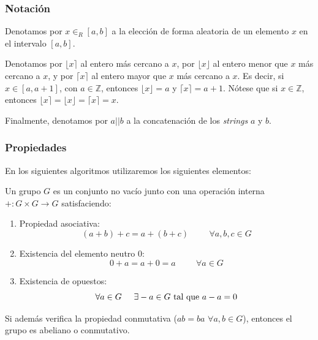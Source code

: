 \subsubsection{Notación}

Denotamos por $x \in_{R} [a, b]$ a la elección de forma aleatoria de un elemento $x$ en el intervalo $[a, b]$.

Denotamos por $\lfloor x \rceil$ al entero más cercano a $x$, por $\lfloor x \rfloor$ al entero menor que $x$ más cercano a $x$, y por $\lceil x \rceil$ al entero mayor que $x$ más cercano a $x$. Es decir, si $x \in [a, a+1]$, con $a \in \mathbb{Z}$, entonces $\lfloor x \rfloor = a$ y $\lceil x \rceil = a + 1$. Nótese que si $x \in \mathbb{Z}$, entonces $\lfloor x \rceil = \lfloor x \rfloor = \lceil x \rceil = x$.

Finalmente, denotamos por $a||b$ a la concatenación de los \emph{strings} $a$ y $b$.

\subsubsection{Propiedades}

En los siguientes algoritmos utilizaremos los siguientes elementos:

\begin{definition}[Grupo]
Un grupo $G$ es un conjunto no vacío junto con una operación interna $+: G \times G \to G$ satisfaciendo:
\begin{enumerate}
    \item Propiedad asociativa:
    $$(a + b) + c = a + (b + c) \hspace{1cm} \forall a, b, c \in G$$
    \item Existencia del elemento neutro 0:
    $$0 + a = a + 0 = a \hspace{1cm} \forall a \in G$$
    \item Existencia de opuestos:
    $$\forall a \in G \hspace{0.5cm} \exists -a \in G \text{ tal que } a - a = 0$$
\end{enumerate}

Si además verifica la propiedad conmutativa ($ab = ba$ $\forall a, b \in G$), entonces el grupo es abeliano o conmutativo.
\end{definition}

